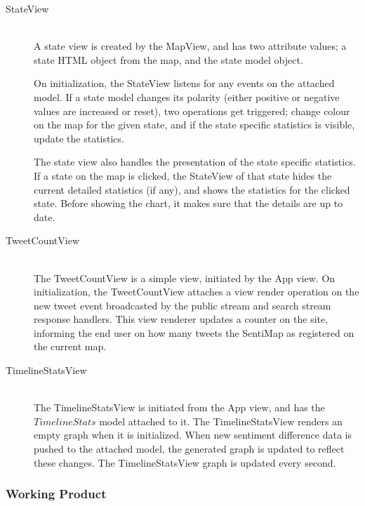 \begin{description}
\item[StateView] \hfill \\

A state view is created by the MapView, and has two attribute values; a state HTML object from the map, and the state model object. 

On initialization, the StateView listens for any events on the attached model. If a state model changes its polarity (either positive or negative values are increased or reset), two operations get triggered; change colour on the map for the given state, and if the state specific statistics is visible, update the statistics.

The state view also handles the presentation of the state specific statistics. If a state on the map is clicked, the StateView of that state hides the current detailed statistics (if any), and shows the statistics for the clicked state. Before showing the chart, it makes sure that the details are up to date. 

\item[TweetCountView] \hfill \\

The TweetCountView is a simple view, initiated by the App view. On initialization, the TweetCountView attaches a view render operation on the new tweet event broadcasted by the public stream and search stream response handlers. This view renderer updates a counter on the site, informing the end user on how many tweets the SentiMap as registered on the current map. 

\item[TimelineStatsView] \hfill \\

The TimelineStatsView is initiated from the App view, and has the $TimelineStats$ model attached to it. The TimelineStatsView renders an empty graph when it is initialized. When new sentiment difference data is pushed to the attached model, the generated graph is updated to reflect these changes. The TimelineStatsView graph is updated every second. 

\end{description}

\subsubsection{Working Product}

